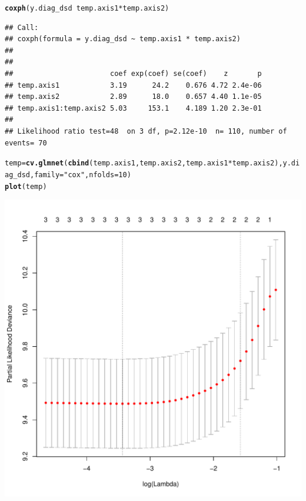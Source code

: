 \documentclass{article}\usepackage[]{graphicx}\usepackage[]{color}
\makeatletter
\def\maxwidth{ %
  \ifdim\Gin@nat@width>\linewidth
    \linewidth
  \else
    \Gin@nat@width
  \fi
}
\newcommand{\hlnum}[1]{\textcolor[rgb]{0.686,0.059,0.569}{#1}}%
\newcommand{\hlstr}[1]{\textcolor[rgb]{0.192,0.494,0.8}{#1}}%
\newcommand{\hlopt}[1]{\textcolor[rgb]{0,0,0}{#1}}%
\newcommand{\hlstd}[1]{\textcolor[rgb]{0.345,0.345,0.345}{#1}}%
\newcommand{\hlkwb}[1]{\textcolor[rgb]{0.69,0.353,0.396}{#1}}%
\newcommand{\hlkwc}[1]{\textcolor[rgb]{0.333,0.667,0.333}{#1}}%
\newcommand{\hlkwd}[1]{\textcolor[rgb]{0.737,0.353,0.396}{\textbf{#1}}}%
\newenvironment{kframe}{%
 \def\at@end@of@kframe{}%
 \ifinner\ifhmode%
  \def\at@end@of@kframe{\end{minipage}}%
  \begin{minipage}{\columnwidth}%
 \fi\fi%
 \def\FrameCommand##1{\hskip\@totalleftmargin \hskip-\fboxsep
 \colorbox{shadecolor}{##1}\hskip-\fboxsep
     \hskip-\linewidth \hskip-\@totalleftmargin \hskip\columnwidth}%
 \MakeFramed {\advance\hsize-\width
   \@totalleftmargin\z@ \linewidth\hsize
   \@setminipage}}%
 {\par\unskip\endMakeFramed%
 \at@end@of@kframe}
\newenvironment{knitrout}{}{} %
\makeatother
\begin{document}
\begin{knitrout}
\begin{kframe}\begin{alltt}
\hlkwd{coxph}\hlstd{(y.diag_dsd} \hlopt{~} \hlstd{temp.axis1} \hlopt{*} \hlstd{temp.axis2)}
\end{alltt}
\begin{verbatim}
## Call:
## coxph(formula = y.diag_dsd ~ temp.axis1 * temp.axis2)
## 
## 
##                       coef exp(coef) se(coef)    z       p
## temp.axis1            3.19      24.2    0.676 4.72 2.4e-06
## temp.axis2            2.89      18.0    0.657 4.40 1.1e-05
## temp.axis1:temp.axis2 5.03     153.1    4.189 1.20 2.3e-01
## 
## Likelihood ratio test=48  on 3 df, p=2.12e-10  n= 110, number of events= 70
\end{verbatim}
\begin{alltt}
\hlstd{temp} \hlkwb{=} \hlkwd{cv.glmnet}\hlstd{(}\hlkwd{cbind}\hlstd{(temp.axis1, temp.axis2, temp.axis1}\hlopt{*}\hlstd{temp.axis2), y.diag_dsd,} \hlkwc{family} \hlstd{=} \hlstr{"cox"}\hlstd{,} \hlkwc{nfolds} \hlstd{=} \hlnum{10}\hlstd{)}
\hlkwd{plot}\hlstd{(temp)}
\end{alltt}
\end{kframe}

{\centering \includegraphics[width=\maxwidth]{figure/metagene-pairs-11} 

}



\end{knitrout}
\end{document}
